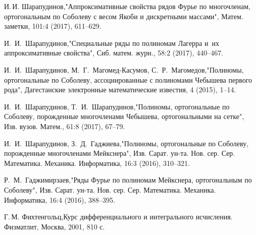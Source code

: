 \begin{thebibliography}{20}
И.\,И. Шарапудинов,"Аппроксимативные свойства рядов Фурье по многочленам, ортогональным по Соболеву с весом Якоби и дискретными массами", Матем. заметки, 101:4 (2017), 611--629.

И.~И.~Шарапудинов,"Специальные ряды по полиномам Лагерра и~их аппроксимативные свойства", Сиб. матем. журн., 58:2 (2017), 440--467.

И.~И.~Шарапудинов, М.~Г.~Магомед-Касумов, С.~Р.~Магомедов,"Полиномы, ортогональные по Соболеву, ассоциированные с полиномами Чебышева первого рода", Дагестанские электронные математические известия, 4 (2015), 1--14.

И.~И.~Шарапудинов, Т.~И.~Шарапудинов,"Полиномы, ортогональные по Соболеву, порожденные многочленами Чебышева, ортогональными на сетке", Изв. вузов. Матем., 61:8 (2017), 67--79.

И.~И.~Шарапудинов, З.~Д.~Гаджиева,"Полиномы, ортогональные по Соболеву, порожденные многочленами Мейкснера", Изв. Сарат. ун-та. Нов. сер. Сер. Математика. Механика. Информатика, 16:3 (2016), 310--321.

Р.~М.~Гаджимирзаев,"Ряды Фурье по полиномам Мейкснера, ортогональным по Соболеву", Изв. Сарат. ун-та. Нов. сер. Сер. Математика. Механика. Информатика, 16:4 (2016), 388--395.

Г.\,М. Фихтенгольц,Курс дифференциального и интегрального исчисления. Физматлит, Москва, 2001, 810 с.



\end{thebibliography}